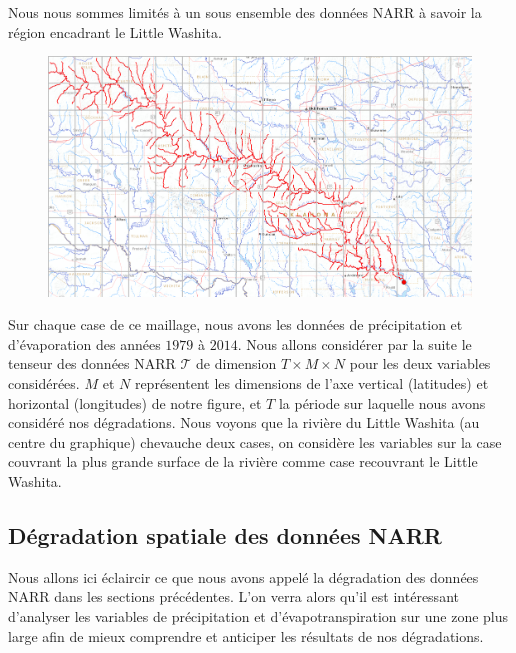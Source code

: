 \documentclass[a4paper,11pt]{article}
\numberwithin{equation}{section}
\begin{document}
\vspace{0.7 cm}

Nous nous sommes limités à un sous ensemble des données NARR à savoir la région encadrant le Little Washita.
 

\begin{figure}[H]
	\begin{center}
		\includegraphics[scale=0.3]{Little_Washita.png}
	\end{center}
	\label{fig-Little-Washita_maillage}
\end{figure}

Sur chaque case de ce maillage, nous avons les données de précipitation et d'évaporation des années $1979$ à $2014$. Nous allons considérer par la suite le tenseur des données NARR $\mathcal{T}$ de dimension $T \times M\times N$ pour les deux variables considérées. $M$ et $N$ représentent les dimensions de l'axe vertical (latitudes) et horizontal (longitudes) de notre figure, et $T$ la période sur laquelle nous avons considéré nos dégradations. Nous voyons que la rivière du Little Washita (au centre du graphique) chevauche deux cases, on considère les variables sur la case couvrant la plus grande surface de la rivière comme case recouvrant le Little Washita.

\subsection{Dégradation spatiale des données NARR}
\label{ch:degradation-NARR}
Nous allons ici éclaircir ce que nous avons appelé la dégradation des données NARR dans les sections précédentes. L'on verra alors qu'il est intéressant d'analyser les variables de précipitation et d'évapotranspiration sur une zone plus large afin de mieux comprendre et anticiper les résultats de nos dégradations. 
\end{document}
